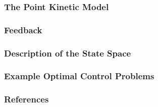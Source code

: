 \documentclass[10pt,compress]{beamer}
\begin{document}
\begin{frame}\frametitle{The Point Kinetic Model}

\end{frame}

\begin{frame}\frametitle{Feedback}

\end{frame}

\begin{frame}\frametitle{Description of the State Space}

\end{frame}

\begin{frame}\frametitle{Example Optimal Control Problems}

\end{frame}

\begin{frame}\frametitle{References}

\end{frame}
\end{document}
